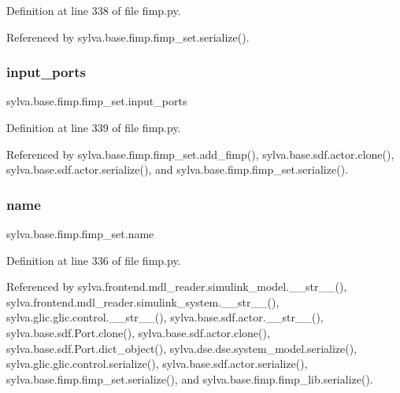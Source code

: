 Definition at line 338 of file fimp.\+py.



Referenced by sylva.\+base.\+fimp.\+fimp\+\_\+set.\+serialize().

\mbox{\label{classsylva_1_1base_1_1fimp_1_1fimp__set_a7e0968ecfd04c497b681319bd7ac70e0}} 
\subsubsection{\texorpdfstring{input\+\_\+ports}{input\_ports}}
{\footnotesize\ttfamily sylva.\+base.\+fimp.\+fimp\+\_\+set.\+input\+\_\+ports}



Definition at line 339 of file fimp.\+py.



Referenced by sylva.\+base.\+fimp.\+fimp\+\_\+set.\+add\+\_\+fimp(), sylva.\+base.\+sdf.\+actor.\+clone(), sylva.\+base.\+sdf.\+actor.\+serialize(), and sylva.\+base.\+fimp.\+fimp\+\_\+set.\+serialize().

\mbox{\label{classsylva_1_1base_1_1fimp_1_1fimp__set_a6bd6ecb11789d4e76631517eca054821}} 
\subsubsection{\texorpdfstring{name}{name}}
{\footnotesize\ttfamily sylva.\+base.\+fimp.\+fimp\+\_\+set.\+name}



Definition at line 336 of file fimp.\+py.



Referenced by sylva.\+frontend.\+mdl\+\_\+reader.\+simulink\+\_\+model.\+\_\+\+\_\+str\+\_\+\+\_\+(), sylva.\+frontend.\+mdl\+\_\+reader.\+simulink\+\_\+system.\+\_\+\+\_\+str\+\_\+\+\_\+(), sylva.\+glic.\+glic.\+control.\+\_\+\+\_\+str\+\_\+\+\_\+(), sylva.\+base.\+sdf.\+actor.\+\_\+\+\_\+str\+\_\+\+\_\+(), sylva.\+base.\+sdf.\+Port.\+clone(), sylva.\+base.\+sdf.\+actor.\+clone(), sylva.\+base.\+sdf.\+Port.\+dict\+\_\+object(), sylva.\+dse.\+dse.\+system\+\_\+model.\+serialize(), sylva.\+glic.\+glic.\+control.\+serialize(), sylva.\+base.\+sdf.\+actor.\+serialize(), sylva.\+base.\+fimp.\+fimp\+\_\+set.\+serialize(), and sylva.\+base.\+fimp.\+fimp\+\_\+lib.\+serialize().

